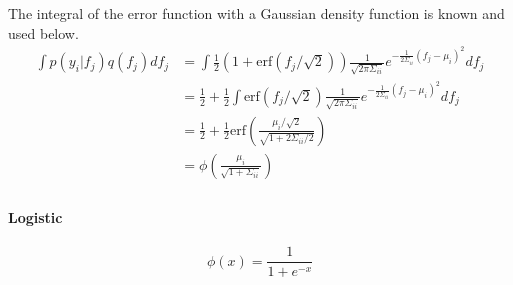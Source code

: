 \documentclass[5p,11pt]{article}
\begin{document}
The integral of the error function with a Gaussian density function is known and used below.
\begin{equation}
    \begin{aligned}
        \int p(y_i|f_j) q(f_j) df_j &= \int \frac{1}{2}\left( 1 + \mathrm{erf}(f_j/\sqrt{2})\right) \frac{1}{\sqrt{2\pi\Sigma_{ii}}}e^{-\frac{1}{2\Sigma_{ii}}(f_j-\mu_i)^2} df_j\\
        &= \frac{1}{2} + \frac{1}{2}\int \mathrm{erf}(f_j/\sqrt{2})\frac{1}{\sqrt{2\pi\Sigma_{ii}}}e^{-\frac{1}{2\Sigma_{ii}}(f_j-\mu_i)^2} df_j\\
        &= \frac{1}{2} + \frac{1}{2}\mathrm{erf}\left(\frac{\mu_i/\sqrt{2}}{\sqrt{1+2\Sigma_{ii}/2}}\right)\\
        &= \phi\left(\frac{\mu_i}{\sqrt{1+\Sigma_{ii}}}\right)\\
    \end{aligned}
\end{equation}


\paragraph{Logistic}
$$ \phi(x) = \frac{1}{1+e^{-x}} $$
\end{document}
